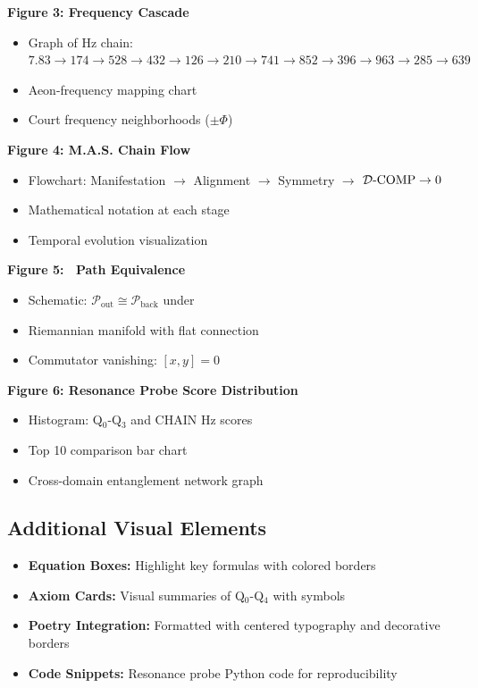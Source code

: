 \textbf{Figure 3: Frequency Cascade}
\begin{itemize}
    \item Graph of Hz chain: $7.83 \to 174 \to 528 \to 432 \to 126 \to 210 \to 741 \to 852 \to 396 \to 963 \to 285 \to 639$
    \item Aeon-frequency mapping chart
    \item Court frequency neighborhoods ($\pm\Phi$)
\end{itemize}

\textbf{Figure 4: M.A.S. Chain Flow}
\begin{itemize}
    \item Flowchart: Manifestation $\to$ Alignment $\to$ Symmetry $\to$ $\mathcal{D}\text{-}\mathrm{COMP} \to 0$
    \item Mathematical notation at each stage
    \item Temporal evolution visualization
\end{itemize}

\textbf{Figure 5: \TSP\ Path Equivalence}
\begin{itemize}
    \item Schematic: $\mathcal{P}_{\text{out}} \cong \mathcal{P}_{\text{back}}$ under \TSP
    \item Riemannian manifold with flat connection
    \item Commutator vanishing: $[x,y] = 0$
\end{itemize}

\textbf{Figure 6: Resonance Probe Score Distribution}
\begin{itemize}
    \item Histogram: Q$_0$-Q$_3$ and CHAIN Hz scores
    \item Top 10 comparison bar chart
    \item Cross-domain entanglement network graph
\end{itemize}

\subsection{Additional Visual Elements}
\begin{itemize}
    \item \textbf{Equation Boxes:} Highlight key formulas with colored borders
    \item \textbf{Axiom Cards:} Visual summaries of Q$_0$-Q$_4$ with symbols
    \item \textbf{Poetry Integration:} Formatted with centered typography and decorative borders
    \item \textbf{Code Snippets:} Resonance probe Python code for reproducibility
\end{itemize}


